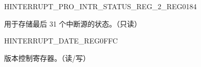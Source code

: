 \begin{register}{H}{INTERRUPT\_PRO\_INTR\_STATUS\_REG\_2\_REG}{\hexprefix{}0184}\label{regdesc:INTERRUPTPROINTRSTATUSREG2REG}
%
\regnewline%
\begin{regdesc}\begin{reglist}
\label{fielddesc:INTERRUPTPROINTRSTATUS2}\item [INTERRUPT\_PRO\_INTR\_STATUS\_2] 用于存储最后 31 个中断源的状态。（只读）
\end{reglist}\end{regdesc}
\end{register}


\begin{register}{H}{INTERRUPT\_DATE\_REG}{\hexprefix{}0FFC}\label{regdesc:INTERRUPTREGDATEREG}
%
%
\regnewline%
\begin{regdesc}\begin{reglist}
\label{fielddesc:INTERRUPTINTERRUPTREGDATE}\item [INTERRUPT\_DATE] 版本控制寄存器。（读/写）
\end{reglist}\end{regdesc}
\end{register}


